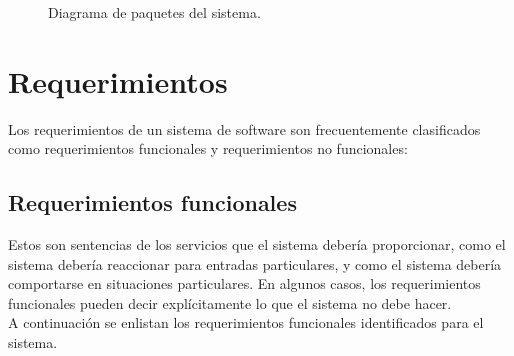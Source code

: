 	\begin{figure}[htbp!]
		\begin{center}
			\caption{Diagrama de paquetes del sistema.}
			\label{fig:paquetes}
		\end{center}
	\end{figure}
	

\section{Requerimientos}

	Los requerimientos de un sistema de software son frecuentemente clasificados como requerimientos funcionales y requerimientos no funcionales: 

\subsection{Requerimientos funcionales}

	Estos son sentencias de los servicios que el sistema debería proporcionar, como el sistema debería reaccionar para entradas particulares, y como el sistema debería comportarse en situaciones particulares. En algunos casos, los requerimientos funcionales pueden decir explícitamente lo que el sistema no debe hacer. \\
	
	A continuación se enlistan los requerimientos funcionales identificados para el sistema.	
	
